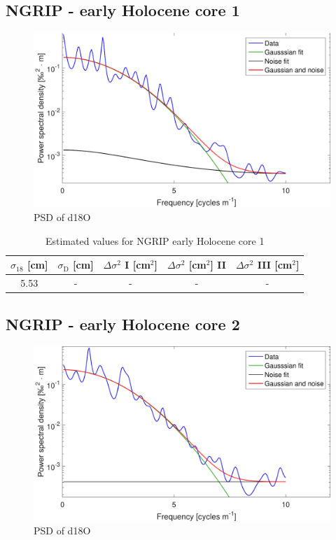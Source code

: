 \documentclass[11pt, draftcls, onecolumn]{IEEEtran} %
\numberwithin{equation}{section}
\numberwithin{table}{section}
\numberwithin{figure}{section}
\begin{document}
\begin{appendices}
\clearpage
\subsection{NGRIP - early Holocene core 1}

\begin{figure}[H]
	\vspace*{2mm}
	\begin{center}
		\includegraphics[width=.5\textwidth]{Figure_35}
		\caption{PSD of d18O}  \label{fig:NGRIP_early1}
	\end{center}
\end{figure}

\begin{table}[H]
	\center
	\caption{Estimated values for NGRIP early Holocene core 1}
	\label{NGRIP_early1_holo}
	\begin{tabular}{c c c c c} 
		\toprule
		$\sigma_{18}$ [cm] & $\sigma_\mathrm{D}$ [cm] & $\Delta\sigma^2$ I [cm$^2$] & $\Delta\sigma^2$ [cm$^2$] II & $\Delta\sigma^2$ III [cm$^2$] \\
		\midrule
		5.53 &   - &    - &     - &     - \\
		\bottomrule		
	\end{tabular}
\end{table}

\clearpage

\subsection{NGRIP - early Holocene core 2}

\begin{figure}[H]
	\vspace*{2mm}
	\begin{center}
		\includegraphics[width=.5\textwidth]{Figure_36}
		\caption{PSD of d18O}  \label{fig:NGRIP_early2}
	\end{center}
\end{figure}


\end{appendices}
\end{document}
